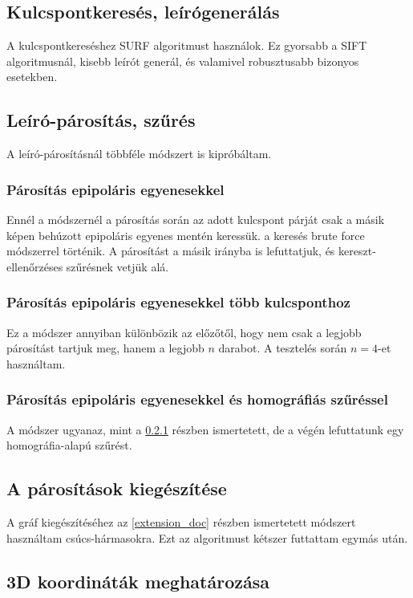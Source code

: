 \documentclass{article}
\begin{document}
	\subsection{Kulcspontkeresés, leírógenerálás}	
	A kulcspontkereséshez SURF algoritmust használok. Ez gyorsabb a SIFT algoritmusnál, kisebb leírót generál, és valamivel robusztusabb bizonyos esetekben.
	
	\subsection{Leíró-párosítás, szűrés}
	A leíró-párosításnál többféle módszert is kipróbáltam.
	
	\subsubsection{Párosítás epipoláris egyenesekkel}
	\label{epilines}
	Ennél a módszernél a párosítás során az adott kulcspont párját csak a másik képen behúzott epipoláris egyenes mentén keressük. a keresés brute force módszerrel történik. A párosítást a másik irányba is lefuttatjuk, és kereszt-ellenőrzéses szűrésnek vetjük alá.
	
	\subsubsection{Párosítás epipoláris egyenesekkel több kulcsponthoz}
	\label{epilines_multiple}
	Ez a módszer annyiban különbözik az előzőtől, hogy nem csak a legjobb párosítást tartjuk meg, hanem a legjobb $n$ darabot. A tesztelés során $n=4$-et használtam.
	
	\subsubsection{Párosítás epipoláris egyenesekkel és homográfiás szűréssel}
	\label{epilines_homogr}
	A módszer ugyanaz, mint a \ref{epilines} részben ismertetett, de a végén lefuttatunk egy homográfia-alapú szűrést.
	
	\subsection{A párosítások kiegészítése}
	\label{extension}
	A gráf kiegészítéséhez az \eqref{extension_doc} részben ismertetett módszert használtam csúcs-hármasokra. Ezt az algoritmust kétszer futtattam egymás után.
	
	\subsection{3D koordináták meghatározása}
\end{document}

